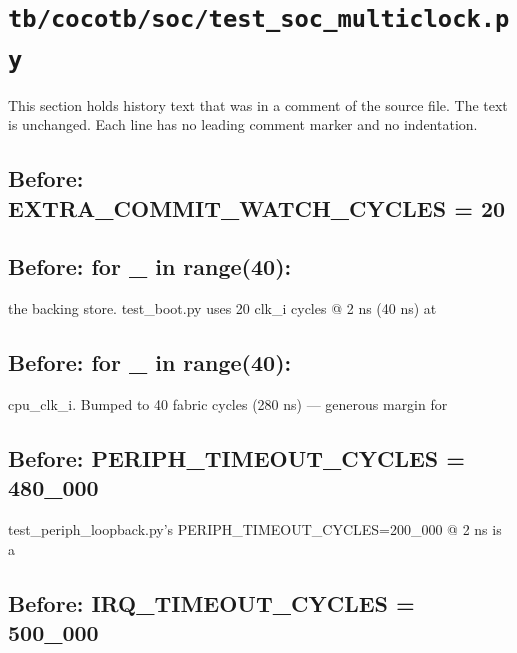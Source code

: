 \section{\texttt{tb/cocotb/soc/test\_soc\_multiclock.py}}\label{cr:suite:soc-test-soc-multiclock}

This section holds history text that was in a comment of the source file. The text is unchanged. Each line has no leading comment marker and no indentation.

\begin{record}

\subsection*{Before: EXTRA\_COMMIT\_WATCH\_CYCLES = 20}


\subsection*{Before: for \_ in range(40):}

\begin{textblock}
the backing store. test_boot.py uses 20 clk_i cycles @ 2 ns (40 ns) at
\end{textblock}

\subsection*{Before: for \_ in range(40):}

\begin{textblock}
cpu_clk_i. Bumped to 40 fabric cycles (280 ns) — generous margin for
\end{textblock}

\subsection*{Before: PERIPH\_TIMEOUT\_CYCLES = 480\_000}

\begin{textblock}
test_periph_loopback.py's PERIPH_TIMEOUT_CYCLES=200_000 @ 2 ns is a
\end{textblock}

\subsection*{Before: IRQ\_TIMEOUT\_CYCLES = 500\_000}


\end{record}
